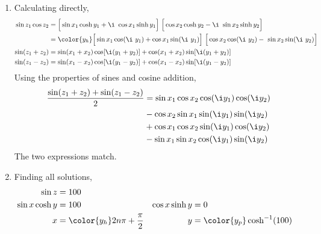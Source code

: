 \begin{enumerate}
    \item Calculating directly,
          \begin{align}
              \sin z_1 \cos z_2 & = \Big[ \sin x_1 \cosh y_1
                  + \i\ \cos x_1 \sinh y_1 \Big]\ \Big[ \cos x_2 \cosh y_2 - \i
              \ \sin x_2 \sinh y_2 \Big]                                     \\
                                & = \color{y_h} \Big[ \sin x_1 \cos(\i\ y_1)
                  + \cos x_1 \sin(\i\ y_1) \Big]\ \Big[ \cos x_2 \cos(\i\ y_2) -
              \ \sin x_2 \sin(\i\ y_2) \Big]                                 \\
              \sin(z_1 + z_2)   & = \sin(x_1 + x_2) \cos[\i(y_1 + y_2)]
              + \cos(x_1 + x_2) \sin[\i(y_1 + y_2)]                          \\
              \sin(z_1 - z_2)   & = \sin(x_1 - x_2) \cos[\i(y_1 - y_2)]
              + \cos(x_1 - x_2) \sin[\i(y_1 - y_2)]
          \end{align}
          Using the properties of sines and cosine addition,
          \begin{align}
              \frac{\sin(z_1 + z_2) + \sin(z_1 - z_2)}{2} & = \sin x_1 \cos x_2
              \cos(\i y_1) \cos(\i y_2)                                         \\
                                                          & - \cos x_2 \sin x_1
              \sin(\i y_1) \sin(\i y_2)
              \nonumber                                                         \\
                                                          & + \cos x_1 \cos x_2
              \sin(\i y_1) \cos(\i y_2) \nonumber                               \\
                                                          & - \sin x_1 \sin x_2
              \cos(\i y_1) \sin(\i y_2)
          \end{align}
          The two expressions match.

    \item Finding all solutions,
          \begin{align}
              \sin z         & = 100                                 \\
              \sin x \cosh y & = 100                               &
              \cos x \sinh y & = 0                                   \\
              x              & = \color{y_h} 2n\pi + \frac{\pi}{2} &
              y              & = \color{y_p} \cosh^{-1}(100)
          \end{align}


\end{enumerate}
